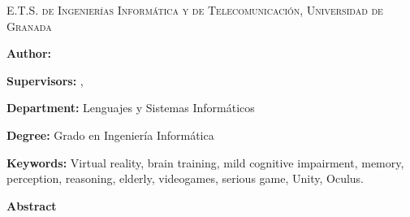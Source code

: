 
\pagestyle{fancy}

\begin{center}
	\scshape
	E.T.S. de Ingenierías Informática y de Telecomunicación, Universidad de Granada
\end{center}

\bigskip

\begin{center}
	\Large \scshape
	\textbf{\tfgtitlenameENG}
\end{center}

\bigskip \bigskip \bigskip

\begin{minipage}{\textwidth}

\textbf{Author:} \tfgauthorname

\medskip

\textbf{Supervisors:} \tfgtutornameA , \tfgtutornameB

\medskip


\medskip

\textbf{Department:} Lenguajes y Sistemas Informáticos

\medskip

\textbf{Degree:} Grado en Ingeniería Informática

\medskip

\textbf{Keywords:} Virtual reality, brain training, mild cognitive impairment, memory, perception, reasoning, elderly, videogames, serious game, Unity, Oculus.

\bigskip \bigskip


\end{minipage}

\begin{center}
	\textbf{Abstract}
\end{center}



